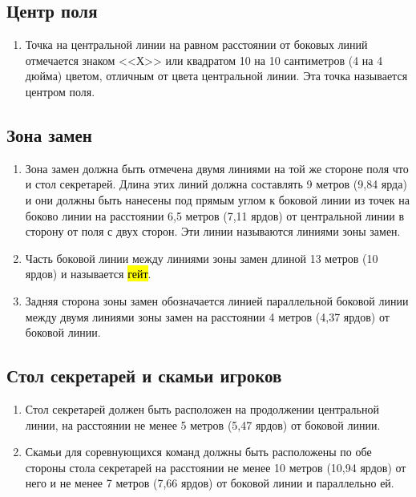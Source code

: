 \documentclass[../main.tex]{subfiles}
\begin{document}
\subsection{Центр поля}
\begin{enumerate}
  \item Точка на центральной линии на равном расстоянии от боковых линий отмечается знаком <<Х>> или квадратом 10 на 10 сантиметров (4 на 4 дюйма) цветом, отличным от цвета центральной линии. Эта точка называется центром поля.
\end{enumerate}

\subsection{Зона замен}
\begin{enumerate}
  \item Зона замен должна быть отмечена двумя линиями на той же стороне поля что и стол секретарей.\newline
  Длина этих линий должна составлять 9 метров (9,84 ярда) и они должны быть нанесены под прямым углом к боковой линии из точек на боково линии на расстоянии 6,5 метров (7,11 ярдов) от центральной линии в сторону от поля с двух сторон. Эти линии называются линиями зоны замен.
  \item Часть боковой линии между линиями зоны замен длиной 13 метров (10 ярдов) и называется {\hl{гейт}}.
  \item Задняя сторона зоны замен обозначается линией параллельной боковой линии между двумя линиями зоны замен на расстоянии 4 метров (4,37 ярдов) от боковой линии.
\end{enumerate}

\subsection{Стол секретарей и скамьи игроков}
\begin{enumerate}
  \item Стол секретарей должен быть расположен на продолжении центральной линии, на расстоянии не менее 5 метров (5,47 ярдов) от боковой линии.
  \item Скамьи для соревнующихся команд должны быть расположены по обе стороны стола секретарей на расстоянии не менее 10 метров (10,94 ярдов) от него и не менее 7 метров (7,66 ярдов) от боковой линии и параллельно ей.
\end{enumerate}
\end{document}
